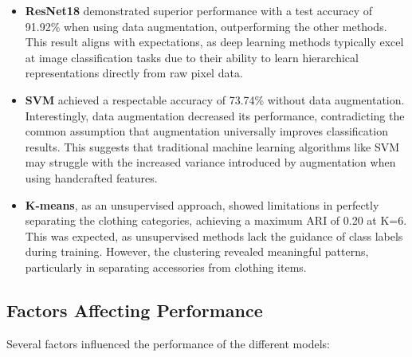 \documentclass[12pt]{article}
\begin{document}
    \begin{itemize}
        \item \textbf{ResNet18} demonstrated superior performance with a test accuracy of 91.92\% when using data augmentation, outperforming the other methods. This result aligns with expectations, as deep learning methods typically excel at image classification tasks due to their ability to learn hierarchical representations directly from raw pixel data.
        
        \item \textbf{SVM} achieved a respectable accuracy of 73.74\% without data augmentation. Interestingly, data augmentation decreased its performance, contradicting the common assumption that augmentation universally improves classification results. This suggests that traditional machine learning algorithms like SVM may struggle with the increased variance introduced by augmentation when using handcrafted features.
        
        \item \textbf{K-means}, as an unsupervised approach, showed limitations in perfectly separating the clothing categories, achieving a maximum ARI of 0.20 at K=6. This was expected, as unsupervised methods lack the guidance of class labels during training. However, the clustering revealed meaningful patterns, particularly in separating accessories from clothing items.
    \end{itemize}
    
    \subsection{Factors Affecting Performance}
    Several factors influenced the performance of the different models:
    
\end{document}
